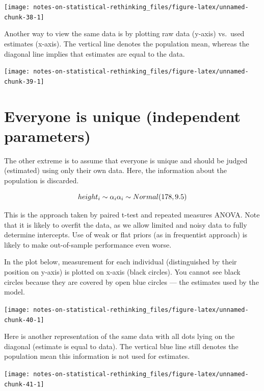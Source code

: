 \documentclass[
]{book}
\begin{document}
\begin{center}\texttt{[image: notes-on-statistical-rethinking\_files/figure-latex/unnamed-chunk-38-1]} \end{center}

Another way to view the same data is by plotting raw data (y-axis) vs.~used estimates (x-axis). The vertical line denotes the population mean, whereas the diagonal line implies that estimates are equal to the data.

\begin{center}\texttt{[image: notes-on-statistical-rethinking\_files/figure-latex/unnamed-chunk-39-1]} \end{center}

\hypertarget{everyone-is-unique-independent-parameters}{%
\section{Everyone is unique (independent parameters)}\label{everyone-is-unique-independent-parameters}}

The other extreme is to assume that everyone is unique and should be judged (estimated) using only their own data. Here, the information about the population is discarded.

\[height_i \sim \alpha_i\\
\alpha_i \sim Normal(178, 9.5)\]

This is the approach taken by paired t-test and repeated measures ANOVA. Note that it is likely to overfit the data, as we allow limited and noisy data to fully determine intercepts. Use of weak or flat priors (as in frequentist approach) is likely to make out-of-sample performance even worse.

In the plot below, measurement for each individual (distinguished by their position on y-axis) is plotted on x-axis (black circles). You cannot see black circles because they are covered by open blue circles --- the estimates used by the model.

\begin{center}\texttt{[image: notes-on-statistical-rethinking\_files/figure-latex/unnamed-chunk-40-1]} \end{center}

Here is another representation of the same data with all dots lying on the diagonal (estimate is equal to data). The vertical blue line still denotes the population mean this information is not used for estimates.

\begin{center}\texttt{[image: notes-on-statistical-rethinking\_files/figure-latex/unnamed-chunk-41-1]} \end{center}
\end{document}
